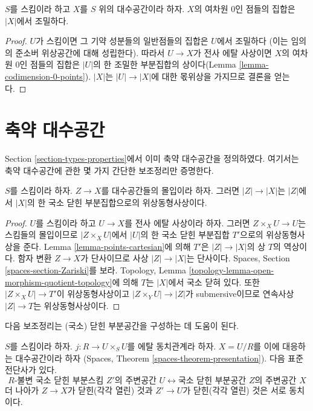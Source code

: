 \begin{lemma}
\label{lemma-codimension-0-points-dense}
$S$를 스킴이라 하고 $X$를 $S$ 위의 대수공간이라 하자.
$X$의 여차원 $0$인 점들의 집합은 $|X|$에서 조밀하다.
\end{lemma}

\begin{proof}
$U$가 스킴이면 그 기약 성분들의 일반점들의 집합은 $U$에서 조밀하다
(이는 임의의 준소버 위상공간에 대해 성립한다).
따라서 $U \to X$가 전사 에탈 사상이면 $X$의 여차원 $0$인 점들의 집합은
$|U|$의 한 조밀한 부분집합의 상이다(Lemma
\ref{lemma-codimension-0-points}). $|X|$는 $|U| \to |X|$에 대한
몫위상을 가지므로 결론을 얻는다.
\end{proof}

\section{축약 대수공간}
\label{section-reduced}

\noindent
Section \ref{section-types-properties}에서 이미 축약 대수공간을 정의하였다.
여기서는 축약 대수공간에 관한 몇 가지 간단한 보조정리만 증명한다.

\begin{lemma}
\label{lemma-subspace-induced-topology}
$S$를 스킴이라 하자. $Z \to X$를 대수공간들의 몰입이라 하자.
그러면 $|Z| \to |X|$는 $|Z|$에서 $|X|$의 한 국소 닫힌 부분집합으로의
위상동형사상이다.
\end{lemma}

\begin{proof}
$U$를 스킴이라 하고 $U \to X$를 전사 에탈 사상이라 하자.
그러면 $Z \times_X U \to U$는 스킴들의 몰입이므로
$|Z \times_X U|$에서 $|U|$의 한 국소 닫힌 부분집합 $T'$으로의
위상동형사상을 준다. Lemma \ref{lemma-points-cartesian}에 의해
$T'$은 $|Z| \to |X|$의 상 $T$의 역상이다.
함자 변환 $Z \to X$가 단사이므로 사상 $|Z| \to |X|$는 단사이다.
Spaces, Section \ref{spaces-section-Zariski}를 보라. Topology, Lemma
\ref{topology-lemma-open-morphism-quotient-topology}에 의해 $T$는
$|X|$에서 국소 닫혀 있다. 또한 $|Z \times_X U| \to T'$이
위상동형사상이고
$|Z \times_Y U| \to |Z|$가 submersive이므로 연속사상
$|Z| \to T$는 위상동형사상이다.
\end{proof}

\noindent
다음 보조정리는 (국소) 닫힌 부분공간을 구성하는 데 도움이 된다.

\begin{lemma}
\label{lemma-subspaces-presentation}
$S$를 스킴이라 하자. $j : R \to U \times_S U$를 에탈 동치관계라 하자.
$X = U/R$를 이에 대응하는 대수공간이라 하자
(Spaces, Theorem \ref{spaces-theorem-presentation}). 다음 표준 전단사가 있다.
$$
R\text{-불변 국소 닫힌 부분스킴 }Z'\text{의 주변공간 }U
\leftrightarrow
\text{국소 닫힌 부분공간 }Z\text{의 주변공간 }X
$$
더 나아가 $Z \to X$가 닫힌(각각 열린) 것과 $Z' \to U$가
닫힌(각각 열린) 것은 서로 동치이다.
\end{lemma}

